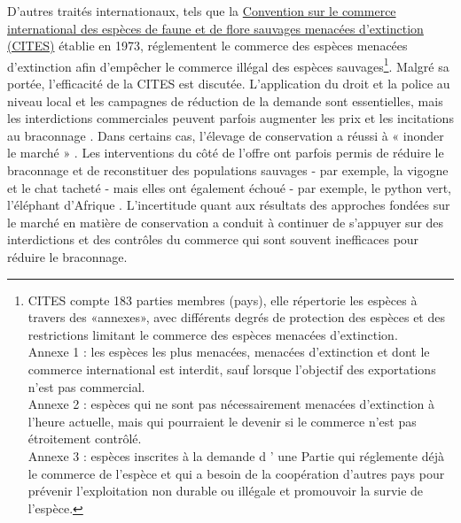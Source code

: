  
 D'autres traités internationaux, tels que la \href{https://cites.org/fra}{Convention sur le commerce international des espèces de faune et de flore sauvages menacées d'extinction (CITES)} établie en 1973, réglementent le commerce des espèces menacées d'extinction afin d'empêcher le commerce illégal des espèces sauvages\footnote{CITES compte 183 parties membres (pays), elle répertorie les espèces à travers des «annexes», avec différents degrés de protection des espèces et des restrictions limitant le commerce des espèces menacées d'extinction. \\
Annexe 1 : les espèces les plus menacées, menacées d'extinction et dont le commerce international est interdit, sauf lorsque l'objectif des exportations n'est pas commercial.
\\
Annexe 2 : espèces qui ne sont pas nécessairement menacées d'extinction à l'heure actuelle, mais qui pourraient le devenir si le commerce n'est pas étroitement contrôlé.
\\
Annexe 3 : espèces inscrites à la demande d ' une Partie qui réglemente déjà le commerce de l'espèce et qui a besoin de la coopération d'autres pays pour prévenir l'exploitation non durable ou illégale et promouvoir la survie de l'espèce. }. Malgré sa portée, l'efficacité de la CITES est discutée. L'application du droit et la police au niveau local \citep{HEID2023102784} et les campagnes de réduction de la demande \citep{macfarlane_reducing_2022, moorhouse_demand_2024} sont essentielles, mais les interdictions commerciales peuvent parfois augmenter les prix et les incitations au braconnage \citep{hsiang_does_2016}. Dans certains cas, l'élevage de conservation a réussi à « inonder le marché » \citep{gentry_looking_2019, phelps_framework_2014, tensen_under_2016}. Les interventions du côté de l'offre ont parfois permis de réduire le braconnage et de reconstituer des populations sauvages - par exemple, la vigogne et le chat tacheté \citep{iucn_world_2000, sahley_biological_2007}- mais elles ont également échoué - par exemple, le python vert, l'éléphant d'Afrique \citep{lyons_wildlife_2011, hsiang_does_2016}.   L'incertitude quant aux résultats des approches fondées sur le marché en matière de conservation a conduit à continuer de s'appuyer sur des interdictions et des contrôles du commerce qui sont souvent inefficaces pour réduire le braconnage.

